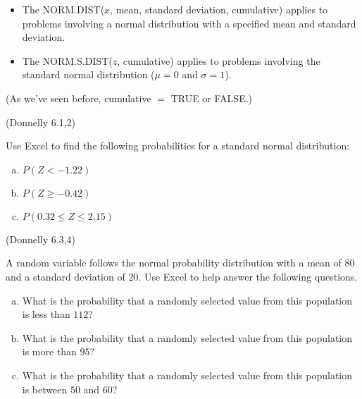 \documentclass[12pt, letterpaper]{article}
\newcounter{exercise}
\theoremstyle{definition}
\begin{document}
\vspace*{.2in}

\begin{itemize}
\item The NORM.DIST($x$, mean, standard deviation, cumulative) applies to problems involving a normal distribution with a specified mean and standard deviation.

\item The NORM.S.DIST($z$, cumulative) applies to problems involving the standard normal distribution ($\mu=0$ and $\sigma=1$).  

\end{itemize}

(As we've seen before, cumulative $=$ TRUE or FALSE.)


\begin{exercise}  (Donnelly 6.1,2)

Use Excel to find the following probabilities for a standard normal distribution:

\end{exercise}

\begin{enumerate}[(a)]

\item $P(Z<-1.22)$

\vfill

\item $P(Z\geq -0.42)$

\vfill

\item $P(0.32\leq Z\leq 2.15)$

\vfill

\end{enumerate}




\begin{exercise}  (Donnelly 6.3,4)

A random variable follows the normal probability distribution with a mean of $80$ and a standard deviation of $20$.  Use Excel to help answer the following questions.

\end{exercise}


\begin{enumerate}[(a)]

\item What is the probability that a randomly selected value from this population is less than $112$?

\vfill

\item What is the probability that a randomly selected value from this population is more than $95$?

\vfill

\item What is the probability that a randomly selected value from this population is between $50$ and $60$?

\vfill

\end{enumerate}
\end{document}
